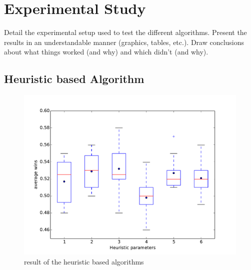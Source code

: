 
\section{Experimental Study} 
\label{sec:exp}

Detail the experimental setup used to test the different algorithms. Present the results in an understandable manner (graphics, tables, etc.). Draw conclusions about what things worked (and why) and which didn't (and why). 



\subsection{Heuristic based Algorithm} 

\begin{figure}
\centering
\includegraphics[scale=0.6]{images/eval_heur.pdf}
\caption{result of the heuristic based algorithms}
\label{fig:eval_evo}
\end{figure}


